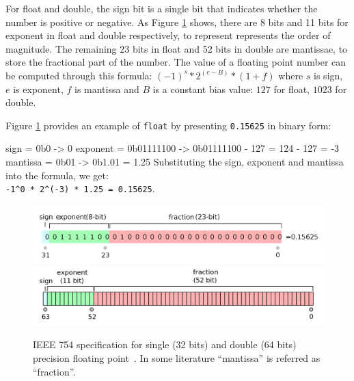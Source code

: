 \documentclass[logo,bsc,singlespacing,parskip]{infthesis}
\newcommand{\dtfloat}{\texttt{float}}
\newenvironment{VerbatimCompact}
  {\vspace*{-2.5mm}\VerbatimEnvironment
   \par\Verbatim}
  {\endVerbatim\vspace*{-2.4mm}}
\begin{document}
For float and double, the sign bit is a single bit that indicates whether the
number is positive or negative. As Figure \ref{fig:ieee-f32} shows, there are 8
bits and 11 bits for exponent in float and double respectively, to represent
represents the order of magnitude. The remaining 23 bits in float and 52 bits in
double are mantissae, to store the fractional part of the number. The value of a
floating point number can be computed through this formula: 
\begin{math} (-1)^s * 2^{(e - B)} * (1 + f)\end{math}
where \begin{math}s\end{math} is sign, \begin{math}e\end{math} is exponent, 
\begin{math}f\end{math} is mantissa and \begin{math}B\end{math} is a constant bias
value: \begin{math}127\end{math} for float, \begin{math}1023\end{math} for double. 

Figure \ref{fig:ieee-f32} provides an example of \dtfloat{} by presenting
\texttt{0.15625} in binary form:
\begin{VerbatimCompact}
sign     = 0b0        -> 0
exponent = 0b01111100 -> 0b01111100 - 127 = 124 - 127 = -3
mantissa = 0b01       -> 0b1.01 = 1.25
\end{VerbatimCompact}
Substituting the sign, exponent and mantissa into the formula, we get: \\
\texttt{-1\^{}0 * 2\^{}(-3) * 1.25 = 0.15625}.



\begin{figure}
    \begin{center}
        \includegraphics[width=\linewidth]{image/ieee-f32.png}
        \includegraphics[width=\linewidth]{image/ieee-f64.png}
        \caption{IEEE 754 specification for single (32 bits) and double (64
        bits) precision floating point~\cite{ieee754-diagram}. In some
        literature ``mantissa'' is referred as ``fraction''.}
        \label{fig:ieee-f32}
    \end{center}
\end{figure}
\end{document}
